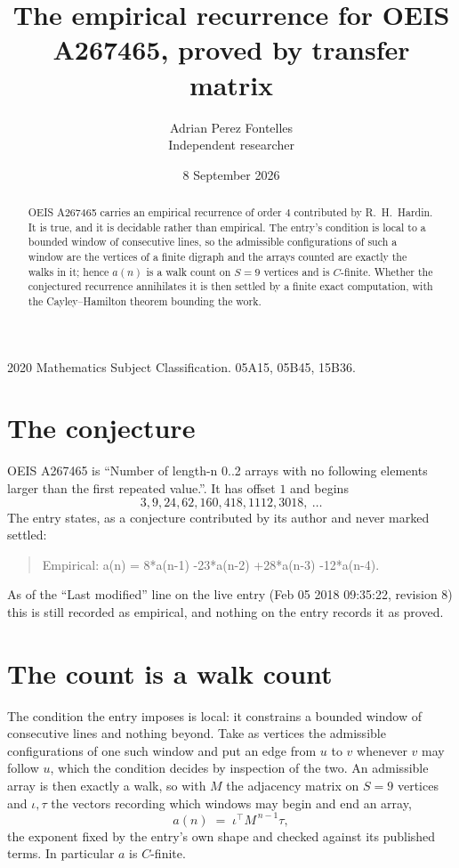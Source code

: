 \documentclass[11pt,a4paper]{article}
\title{The empirical recurrence for OEIS A267465, proved by transfer matrix}
\author{Adrian Perez Fontelles\\ \small Independent researcher}
\date{8 September 2026}
\theoremstyle{plain}
\theoremstyle{definition}
\begin{document}
\maketitle

\begin{abstract}
OEIS A267465 carries an empirical recurrence of order $4$ contributed by R.~H.~Hardin. It is
true, and it is decidable rather than empirical. The entry's condition is local to a bounded window of consecutive lines, so
the admissible configurations of such a window are the vertices of a finite digraph and the
arrays counted are exactly the walks in it; hence $a(n)$ is a walk count on $S=9$ vertices
and is $C$-finite. Whether the conjectured recurrence annihilates it is then settled by a
finite exact computation, with the Cayley--Hamilton theorem bounding the work.
\end{abstract}

\noindent\small 2020 Mathematics Subject Classification. 05A15, 05B45, 15B36.\normalsize

\section{The conjecture}

OEIS A267465 is ``Number of length-n 0..2 arrays with no following elements larger than the first repeated value.''. It has offset $1$ and begins
\[
3, 9, 24, 62, 160, 418, 1112, 3018,\ \dots
\]
The entry states, as a conjecture contributed by its author and never marked settled:
\begin{quote}
Empirical: a(n) = 8*a(n-1) -23*a(n-2) +28*a(n-3) -12*a(n-4).
\end{quote}
As of the ``Last modified'' line on the live entry (Feb 05 2018 09:35:22, revision 8) this is still
recorded as empirical, and nothing on the entry records it as proved.

\section{The count is a walk count}

The condition the entry imposes is local: it constrains a bounded window of consecutive lines and nothing beyond. Take as
vertices the admissible configurations of one such window and put an edge from $u$ to $v$
whenever $v$ may follow $u$, which the condition decides by inspection of the two. An
admissible array is then exactly a walk, so with $M$ the adjacency matrix on $S=9$ vertices
and $\iota,\tau$ the vectors recording which windows may begin and end an array,
\[
a(n)\;=\;\iota^{\!\top}M^{\,n-1}\tau ,
\]
the exponent fixed by the entry's own shape and checked against its published terms. In
particular $a$ is $C$-finite.
\end{document}
